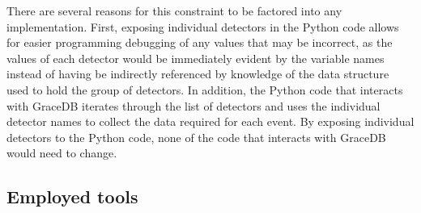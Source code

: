 \documentclass{article}
\begin{document}
\begin{itemize}
        There are several reasons for this constraint to be factored into any implementation.
        First, exposing individual detectors in the Python code allows for easier programming debugging of any values that may be incorrect, as the values of each detector would be immediately evident by the variable names instead of having be indirectly referenced by knowledge of the data structure used to hold the group of detectors.
        In addition, the Python code that interacts with GraceDB iterates through the list of detectors and uses the individual detector names to collect the data required for each event.
        By exposing individual detectors to the Python code, none of the code that interacts with GraceDB would need to change.
\end{itemize}

\subsection{Employed tools} \label{sec:design_process:tools}
\end{document}
